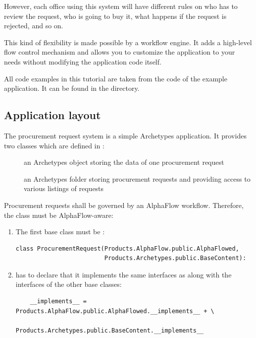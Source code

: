 However, each office using this system will have different rules on who has to
review the request, who is going to buy it, what happens if the request is
rejected, and so on.

This kind of flexibility is made possible by a workflow engine. It adds a
high-level flow control mechanism and allows you to customize the application
to your needs without modifying the application code itself.

\begin{notice}
  All code examples in this tutorial are taken from the code of the example
  application. It can be found in the
   directory.
\end{notice}


\subsection{Application layout}

The procurement request system is a simple Archetypes application. It provides
two classes which are defined in :
\begin{description}
\item[] an Archetypes object storing the data of
  one procurement request
\item[] an Archetypes folder storing procurement
  requests and providing access to various listings of requests
\end{description}

Procurement requests shall be governed by an AlphaFlow workflow. Therefore,
the  class must be AlphaFlow-aware:
\begin{enumerate}
\item The first base class must be :

\begin{verbatim}
class ProcurementRequest(Products.AlphaFlow.public.AlphaFlowed, 
                         Products.Archetypes.public.BaseContent):
\end{verbatim}

\item {} has to declare that it implements the same
  interfaces as  along with the interfaces of the other
  base classes:

\begin{verbatim}
    __implements__ = Products.AlphaFlow.public.AlphaFlowed.__implements__ + \
                     Products.Archetypes.public.BaseContent.__implements__
\end{verbatim}
\end{enumerate}

